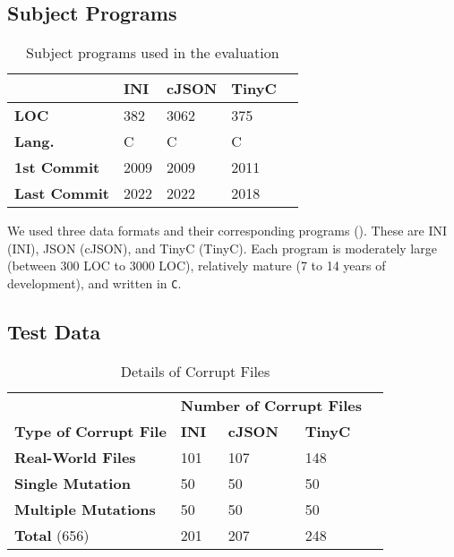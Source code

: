 \documentclass[acmsmall,screen,review,anonymous]{acmart}
\def\<#1>{\texttt{#1}}
\begin{document}
\subsection{Subject Programs} %
\begin{table}[H]\centering
\caption{Subject programs used in the evaluation}
\begin{tabular}{|p{4cm}|p{2cm}|p{2cm}|p{2cm}|p{2cm}|}
\hline
\textbf{} & \textbf{INI} & \textbf{cJSON} & \textbf{TinyC} \\
\hline
\textbf{LOC} & 382 & 3062 & 375\\
\textbf{Lang.} & C & C & C \\
\textbf{1st Commit} & 2009 & 2009 & 2011\\
\textbf{Last Commit} & 2022 & 2022 & 2018\\
\hline
\end{tabular}
\label{tab:subjectprograms}
\end{table}

We used three data formats and their corresponding programs (). These are INI (INI), JSON (cJSON), and TinyC (TinyC). Each program is moderately large (between 300 LOC to 3000 LOC), relatively mature (7 to 14 years of development), and written in \<C>.

\subsection{Test Data} 
%
\begin{table}[!tbp]\centering
\caption{Details of Corrupt Files}
\begin{tabular}{|p{4cm}|p{2cm}|p{2cm}|p{2cm}|p{2cm}|}
\hline
&  \multicolumn{3}{c|}{\textbf{Number of Corrupt Files}}  \\
\textbf{Type of Corrupt File} & \textbf{INI} & \textbf{cJSON} & \textbf{TinyC} \\
\hline
\textbf{Real-World Files} & 101 & 107 & 148 \\
\textbf{Single Mutation} & 50 & 50    & 50 \\
\textbf{Multiple Mutations} & 50 & 50 & 50 \\
\hline
\textbf{Total } (656) & 201 & 207    & 248 \\
\hline
\end{tabular}
\label{tab:inputdetails}
\end{table}
\end{document}

